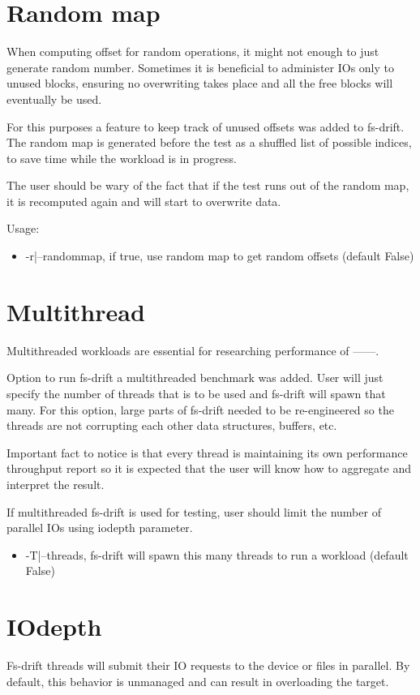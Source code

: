 \documentclass[
  color, %
  table, %
  lof,   %
  lot,   %
]{fithesis3}
\begin{document}
\section{Random map}
When computing offset for random operations, it might not enough to just generate random number. Sometimes it is beneficial to administer IOs only to unused blocks, ensuring no overwriting takes place and all the free blocks will eventually be used.

For this purposes a feature to keep track of unused offsets was added to fs-drift. The random map is generated before the test as a shuffled list of possible indices, to save time while the workload is in progress.

The user should be wary of the fact that if the test runs out of the random map, it is recomputed again and will start to overwrite data.

Usage:
\begin{itemize}
    \item -r|--randommap, if true, use random map to get random offsets (default False)
\end{itemize}

\section{Multithread}
Multithreaded workloads are essential for researching performance of ------.

Option to run fs-drift a multithreaded benchmark was added. User will just specify the number of threads that is to be used and fs-drift will spawn that many. For this option, large parts of fs-drift needed to be re-engineered so the threads are not corrupting each other data structures, buffers, etc.

Important fact to notice is that every thread is maintaining its own performance throughput report so it is expected that the user will know how to aggregate and interpret the result.

If multithreaded fs-drift is used for testing, user should limit the number of parallel IOs using iodepth parameter.


\begin{itemize}
    \item -T|--threads, fs-drift will spawn this many threads to run a workload (default False)
\end{itemize}

\section{IOdepth}
Fs-drift threads will submit their IO requests to the device or files in parallel. By default, this behavior is unmanaged and can result in overloading the target.
\end{document}
